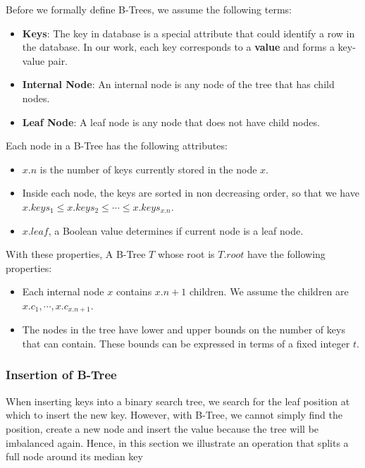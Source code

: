 Before we formally define B-Trees, we assume the following terms:

\begin{itemize}
\item
  \textbf{Keys}: The key in database is a special attribute that could
  identify a row in the database. In our work, each key corresponds to a
  \textbf{value} and forms a key-value pair.
\item
  \textbf{Internal Node}: An internal node is any node of the tree that
  has child nodes.
\item
  \textbf{Leaf Node}: A leaf node is any node that does not have child
  nodes.
\end{itemize}

Each node in a B-Tree has the following attributes:

\begin{itemize}
\item
  $x.n$ is the number of keys currently stored in the node $x$.
\item
  Inside each node, the keys are sorted in non decreasing order, so that
  we have $x.keys_1\leq x.keys_2\leq\cdots\leq x.keys_{x.n}$.
\item
  $x.leaf$, a Boolean value determines if current node is a leaf node.
\end{itemize}

With these properties, A B-Tree $T$ whose root is $T.root$ have the
following properties:

\begin{itemize}
\item
  Each internal node $x$ contains $x.n+1$ children. We assume the
  children are $x.c_1,\cdots,x.c_{x.n+1}$.
\item
  The nodes in the tree have lower and upper bounds on the number of
  keys that can contain. These bounds can be expressed in terms of a
  fixed integer $t$.
\end{itemize}

\subsubsection{Insertion of B-Tree}

When inserting keys into a binary search tree, we search for the leaf
position at which to insert the new key. However, with B-Tree, we cannot
simply find the position, create a new node and insert the value because
the tree will be imbalanced again. Hence, in this section we illustrate
an operation that splits a full node around its median key

